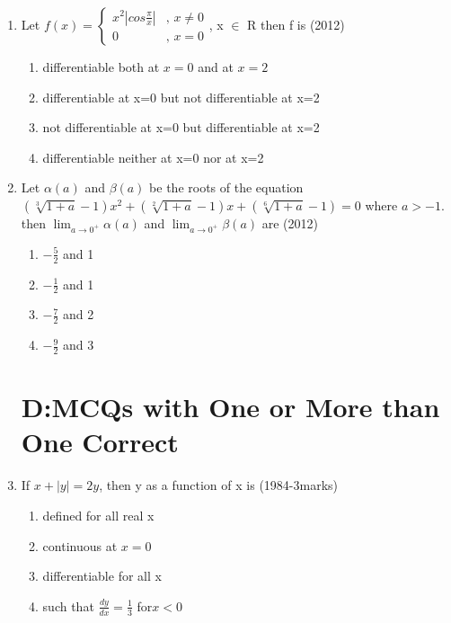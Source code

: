 \documentclass[journal,12pt,twocolumn]{IEEEtran}
\theoremstyle{remark}
\begin{document}
\begin{enumerate}
\item 
Let $f(x) =\begin{cases} x^2|cos \frac{\pi}{x}| & \text{, } x \neq 0 \\ 0 & \text{, } x = 0 
\end{cases}
$, x $\in$ R then f is
\hfill{(2012)} 
\begin{enumerate}[label=\alph*)]
    \item differentiable both at $x=0$ and at $x=2$
    \item differentiable at x=0 but not differentiable at x=2
    \item not differentiable at x=0 but differentiable at x=2
    \item differentiable neither at x=0 nor at x=2 \\
\end{enumerate}

\item 
Let $\alpha(a)$ and $\beta(a)$ be the roots of the equation $(\sqrt[3]{1+a}-1)x^2+(\sqrt[2]{1+a}-1)x+(\sqrt[6]{1+a}-1)=0$ where $a>-1$. then $\lim_{a \to 0^+}{\alpha(a)}$ and $\lim_{a \to 0^+}{\beta(a)}$ are
\hfill{(2012)} 

\begin{enumerate}[label=\alph*)]
    \item $-\frac{5}{2}$ and 1
    \item $-\frac{1}{2}$ and 1
    \item $-\frac{7}{2}$ and 2
    \item $-\frac{9}{2}$ and 3 \\
\end{enumerate}

\section{D:MCQs with One or More than One Correct}

\item If $x+|y|=2y$, then y as a function of x is
\hfill{(1984-3marks)} 
\begin{enumerate}[label=\alph*)]
    \item defined for all real x
    \item continuous at $x=0$
    \item differentiable for all x
    \item such that $\frac{dy}{dx}=\frac{1}{3}$ for$x<0$ \\
\end{enumerate}


\end{enumerate}
\end{document}
